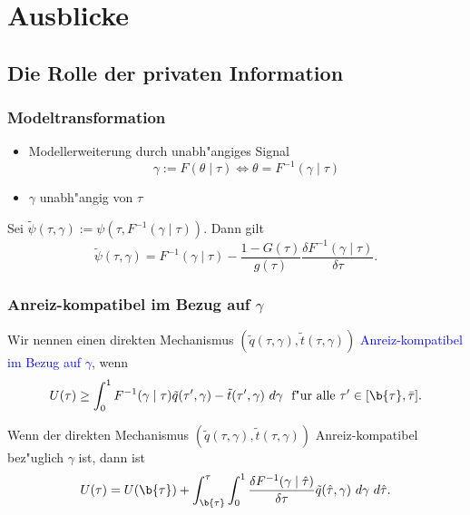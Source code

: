 \section{Ausblicke}

\subsection{Die Rolle der privaten Information}
\begin{frame}
\frametitle{Modeltransformation}
\justifying
\begin{itemize}
  \item Modellerweiterung durch unabh"angiges Signal
  \begin{equation*}
    \gamma := F(\theta \mid \tau) \Leftrightarrow \theta = F^{-1}(\gamma \mid \tau)
  \end{equation*}
  \item $\gamma$ unabh"angig von $\tau$
\end{itemize}
\begin{thmL}
  Sei $\tilde{\psi}(\tau, \gamma) := \psi(\tau, F^{-1}(\gamma \mid \tau))$. Dann gilt
  \begin{equation*}
    \tilde{\psi}(\tau, \gamma) = F^{-1}(\gamma \mid \tau) - \dfrac{1-G(\tau)}{g(\tau)} \dfrac{\delta F^{-1}(\gamma \mid \tau)}{\delta \tau}.
  \end{equation*}
\end{thmL}
\end{frame}

\begin{frame}
\frametitle{Anreiz-kompatibel im Bezug auf $\gamma$}
\justifying
\begin{thmD}
  Wir nennen einen direkten Mechanismus $(\tilde{q}(\tau, \gamma), \tilde{t}(\tau, \gamma))$ \textcolor{blue}{Anreiz-kompatibel im Bezug auf $\gamma$}, wenn
  \begin{equation*}
    U(\tau) \geq \int_{0}^{1} F^{-1}(\gamma \mid \tau) \tilde{q}(\tau', \gamma) - \tilde{t}(\tau', \gamma) \ d \gamma \text{~ f"ur alle } \tau' \in [\b{\tau}, \bar{\tau}].
  \end{equation*}
\end{thmD}
\begin{thmP}
  Wenn der direkten Mechanismus $(\tilde{q}(\tau, \gamma), \tilde{t}(\tau, \gamma))$ Anreiz-kompatibel bez"uglich $\gamma$ ist, dann ist
  \begin{equation*}
    U(\tau) = U(\b{\tau}) + \int_{\b{\tau}}^{\tau} \int_{0}^{1} \dfrac{\delta F^{-1}(\gamma \mid \hat{\tau})}{\delta \tau} \tilde{q}(\hat{\tau}, \gamma) \ d \gamma \ d \hat{\tau}.
  \end{equation*}
\end{thmP}
\end{frame}

